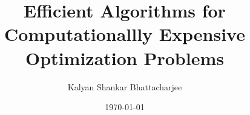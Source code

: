 \documentclass[a4paper,12pt,oneside]{Thesis}
\begin{document}
\pagestyle{empty}
\author{Kalyan Shankar Bhattacharjee}

\title{Efficient Algorithms for Computationallly Expensive Optimization Problems}
\date{\today}
\maketitle

\rhead{\bf\thepage}
\clearpage

\clearpage

\clearpage

\clearpage
%
%

\clearpage

\clearpage





\clearpage

\pagestyle{fancy}
\addtocounter{chapter}{0}









\backmatter

\label{Bibliography}

{\small
%

}


\appendix {}
\renewcommand{\thesection}{A.\arabic{section}}

\end{document}
